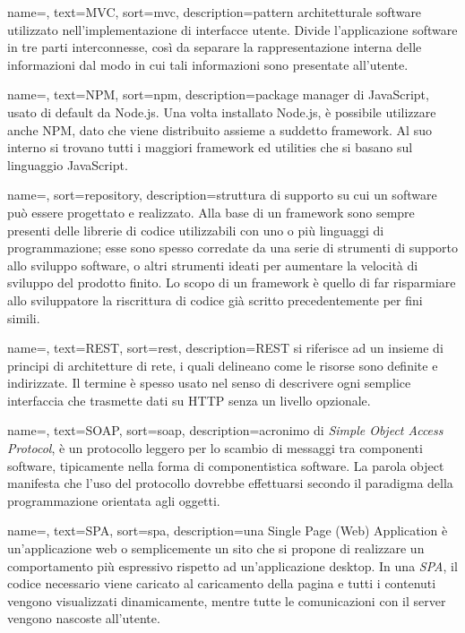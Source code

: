 {
	name=,
	text=MVC,
	sort=mvc,
	description={pattern architetturale software utilizzato nell'implementazione di interfacce utente. Divide l'applicazione software in tre parti interconnesse, così da separare la rappresentazione interna delle informazioni dal modo in cui tali informazioni sono presentate all'utente.}
}

{
	name=,
	text=NPM,
	sort=npm,
	description={package manager di JavaScript, usato di default da Node.js. Una volta installato Node.js, è possibile utilizzare anche NPM, dato che viene distribuito assieme a suddetto framework. Al suo interno si trovano tutti i maggiori framework ed utilities che si basano sul linguaggio JavaScript.}
}

{
	name=,
	sort=repository,
	description={struttura di supporto su cui un software può essere progettato e realizzato. Alla base di un framework sono sempre presenti delle librerie di codice utilizzabili con uno o più linguaggi di programmazione; esse sono spesso corredate da una serie di strumenti di supporto allo sviluppo software, o altri strumenti ideati per aumentare la velocità di sviluppo del prodotto finito. Lo scopo di un framework è quello di far risparmiare allo sviluppatore la riscrittura di codice già scritto precedentemente per fini simili.}
}

{
	name=,
	text=REST,
	sort=rest,
	description={REST si riferisce ad un insieme di principi di architetture di rete, i quali delineano come le risorse sono definite e indirizzate. Il termine è spesso usato nel senso di descrivere ogni semplice interfaccia che trasmette dati su HTTP senza un livello opzionale.}
}

{
  name=,
	text=SOAP,
	sort=soap,
	description={acronimo di \emph{Simple Object Access Protocol}, è un protocollo leggero per lo scambio di messaggi tra componenti software, tipicamente nella forma di componentistica software. La parola object manifesta che l'uso del protocollo dovrebbe effettuarsi secondo il paradigma della programmazione orientata agli oggetti.}
}

{
	name=,
	text=SPA,
	sort=spa,
	description={una Single Page (Web) Application è un'applicazione web o semplicemente un sito che si propone di realizzare un comportamento più espressivo rispetto ad un'applicazione desktop. In una \emph{SPA}, il codice necessario viene caricato al caricamento della pagina e tutti i contenuti vengono visualizzati dinamicamente, mentre tutte le comunicazioni con il server vengono nascoste all'utente.}
}

